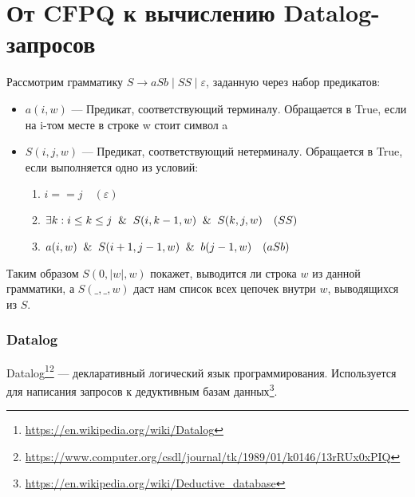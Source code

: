 \chapter{От CFPQ к вычислению Datalog-запросов}\label{Subsection Datalog}
Рассмотрим грамматику  $S \rightarrow aSb \mid SS \mid \varepsilon$, заданную через набор предикатов:
\begin{itemize}
	\item $a(i, w)$ --- Предикат, соответствующий терминалу. Обращается в True, если на i-том месте в строке w стоит символ a
	\item $S(i, j, w)$ --- Предикат, соответствующий нетерминалу. Обращается в True, если выполняется одно из условий:
	\begin{enumerate}
		\item $i == j \quad(\varepsilon)$
		\item $\exists k: i \leq k \leq j \And S(i, k - 1, w) \And S(k, j, w)  \quad (SS)$
		\item  ${a(i, w) \And S(i+1, j-1, w) \And b(j-1, w)} \quad (aSb)$
	\end{enumerate}
\end{itemize}

Таким образом $S(0,\mid w \mid,w)$ покажет, выводится ли строка $w$ из данной грамматики,
а $S(\_,\_,w)$ даст нам список всех цепочек внутри $w$, выводящихся из $S$.

\subsection{Datalog}
Datalog\footnote{\url{https://en.wikipedia.org/wiki/Datalog}}\footnote{\url{https://www.computer.org/csdl/journal/tk/1989/01/k0146/13rRUx0xPIQ}} --- декларативный логический язык программирования. Используется для написания запросов к дедуктивным базам данных\footnote{\url{https://en.wikipedia.org/wiki/Deductive_database}}. \\

